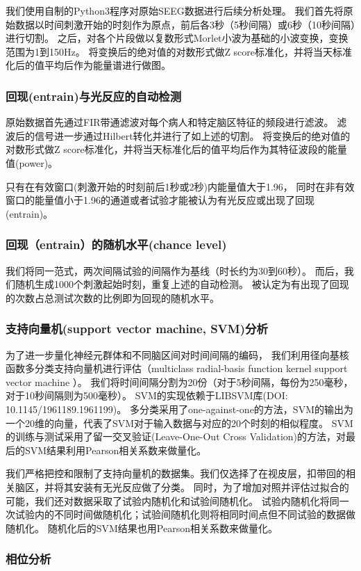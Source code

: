 我们使用自制的Python3程序对原始SEEG数据进行后续分析处理。
我们首先将原始数据以时间刺激开始的时刻作为原点，前后各3秒（5秒间隔）或6秒（10秒间隔）进行切割。
之后，对各个片段做以复数形式Morlet小波为基础的小波变换，变换范围为1到150Hz。
将变换后的绝对值的对数形式做Z score标准化，并将当天标准化后的值平均后作为能量谱进行做图。

\subsubsection{回现(entrain)与光反应的自动检测}

原始数据首先通过FIR带通滤波对每个病人和特定脑区特征的频段进行滤波。
滤波后的信号进一步通过Hilbert转化并进行了如上述的切割。
将变换后的绝对值的对数形式做Z score标准化，并将当天标准化后的值平均后作为其特征波段的能量值(power)。

只有在有效窗口(刺激开始的时刻前后1秒或2秒)内能量值大于1.96，
同时在非有效窗口的能量值小于1.96的通道或者试验才能被认为有光反应或出现了回现(entrain)。

\subsubsection{回现（entrain）的随机水平(chance level)}

我们将同一范式，两次间隔试验的间隔作为基线（时长约为30到60秒）。
而后，我们随机生成1000个刺激起始时刻，重复上述的自动检测。
被认定为有出现了回现的次数占总测试次数的比例即为回现的随机水平。

\subsubsection{支持向量机(support vector machine, SVM)分析}
为了进一步量化神经元群体和不同脑区间对时间间隔的编码，
我们利用径向基核函数多分类支持向量机进行评估（multiclass radial-basis function kernel support vector machine ）。
我们将时间间隔分割为20份（对于5秒间隔，每份为250毫秒，对于10秒间隔则为500毫秒）。
SVM的实现依赖于LIBSVM库(DOI: 10.1145/1961189.1961199)。
多分类采用了one-against-one的方法，SVM的输出为一个20维的向量，代表了SVM对于输入数据与对应的20个时刻的相似程度。
SVM的训练与测试采用了留一交叉验证(Leave-One-Out Cross Validation)的方法，对最后的SVM结果利用Pearson相关系数来做量化。

我们严格把控和限制了支持向量机的数据集。我们仅选择了在视皮层，扣带回的相关脑区，并将其安装有无光反应做了分类。
同时，为了增加对照并评估过拟合的可能，我们还对数据采取了试验内随机化和试验间随机化。
试验内随机化将同一次试验内的不同时间做随机化；试验间随机化则将相同时间点但不同试验的数据做随机化。
随机化后的SVM结果也用Pearson相关系数来做量化。

\subsubsection{相位分析}
